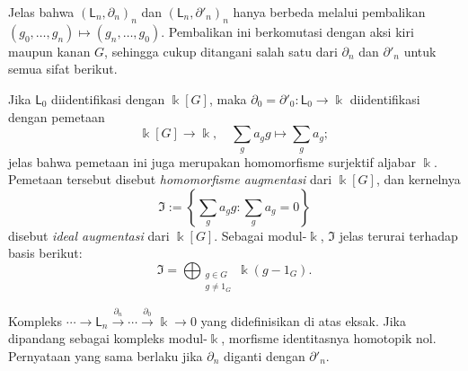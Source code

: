 Jelas bahwa $(\mathsf{L}_n,\partial_n)_n$ dan
$(\mathsf{L}_n,\partial'_n)_n$ hanya berbeda melalui pembalikan
$(g_0,\ldots,g_n)\mapsto(g_n,\ldots,g_0)$. Pembalikan ini berkomutasi dengan
aksi kiri maupun kanan $G$, sehingga cukup ditangani salah satu dari
$\partial_n$ dan $\partial'_n$ untuk semua sifat berikut.

\begin{catatan}\label{rem:augmentation-kG}
	Jika $\mathsf{L}_0$ diidentifikasi dengan $\Bbbk[G]$, maka
	$\partial_0=\partial'_0:\mathsf{L}_0\to\Bbbk$ diidentifikasi dengan
	pemetaan
	\[ \Bbbk[G] \to \Bbbk, \quad \sum_g a_g g \mapsto \sum_g a_g; \]
	jelas bahwa pemetaan ini juga merupakan homomorfisme surjektif aljabar
	$\Bbbk$. Pemetaan tersebut disebut \emph{homomorfisme augmentasi} dari
	$\Bbbk[G]$, dan kernelnya
	\[ \mathfrak{I} := \left\{ \sum_g a_g g : \sum_g a_g = 0 \right\} \]
	disebut \emph{ideal augmentasi} dari $\Bbbk[G]$. Sebagai modul-$\Bbbk$,
	$\mathfrak{I}$ jelas terurai terhadap basis berikut:
	\[ \mathfrak{I} = \bigoplus_{\substack{g \in G \\ g \neq 1_G}} \Bbbk (g - 1_G). \]
\end{catatan}

\begin{lema}\label{prop:L-acyclic}
	Kompleks
	$\cdots\to\mathsf{L}_n\xrightarrow{\partial_n}\cdots
	\xrightarrow{\partial_0}\Bbbk\to0$ yang didefinisikan di atas eksak. Jika
	dipandang sebagai kompleks modul-$\Bbbk$, morfisme identitasnya homotopik nol.
	Pernyataan yang sama berlaku jika $\partial_n$ diganti dengan $\partial'_n$.
\end{lema}


